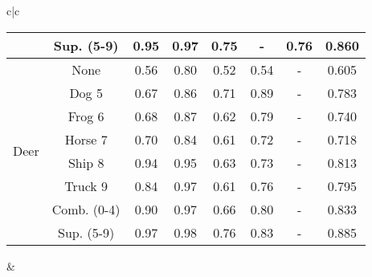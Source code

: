 \documentclass[acmtog, nonacm]{acmart}
\begin{document}
\begin{tabular}{c|c}
\begin{tabular}{@{}c|c|ccccc|c@{}}
                       & Sup. (5-9)                & 0.95  & 0.97 & 0.75 & -    & 0.76 & 0.860                \\
                       \midrule
\multirow{8}{*}{Deer}  & None                      & 0.56  & 0.80 & 0.52 & 0.54 & -    & 0.605                \\
                       & Dog 5                     & 0.67  & 0.86 & 0.71 & 0.89 & -    & 0.783                \\
                       & Frog 6                    & 0.68  & 0.87 & 0.62 & 0.79 & -    & 0.740                \\
                       & Horse 7                   & 0.70  & 0.84 & 0.61 & 0.72 & -    & 0.718                \\
                       & Ship 8                    & 0.94  & 0.95 & 0.63 & 0.73 & -    & 0.813                \\
                       & Truck 9                   & 0.84  & 0.97 & 0.61 & 0.76 & -    & 0.795                \\
                       & Comb. (0-4)               & 0.90  & 0.97 & 0.66 & 0.80 & -    & 0.833                \\
                       & Sup. (5-9)                & 0.97  & 0.98 & 0.76 & 0.83 & -    & 0.885               
\\
\midrule
\end{tabular}

     & 
     

\end{tabular}
\end{document}
